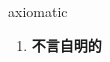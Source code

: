 
\begin{frame}
{\huge axiomatic}
\begin{center}
\begin{enumerate}\Large
  \item \textbf{不言自明的}
\end{enumerate}
\end{center}
\end{frame}
